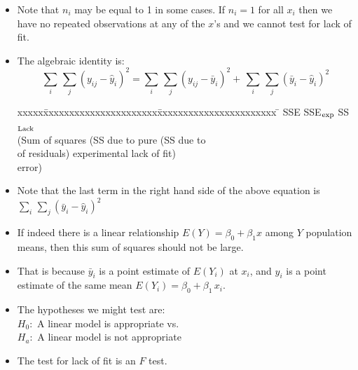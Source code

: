 \documentclass[xcolor=dvipsnames,12pt]{beamer}
\begin{document}
\begin{frame}
\begin{itemize}
\item Note that $n_i$ may be equal to 1 in some cases.  If $n_i=1$ for all $x_i$  then we have no
repeated observations at any of the  $x$'s and we cannot test for lack of
fit. \\[.1in]
\item The algebraic identity is:
$$
  \sum_i\,\sum_j (y_{ij} - \hat{y}_i)^2 =
  \sum_i\,\sum_j (y_{ij} - \bar{y}_i)^2 +\,
  \sum_i\,\sum_j (\bar{y}_i - \hat{y}_i)^2
$$
\begin{small}
\begin{tabbing}
xxxxx\=xxxxxxxxxxxxxxxxxxxxxx\= xxxxxxxxxxxxxxxxxxxxxxx \= \kill
\>SSE                 \> SSE$_{\rm{exp}}$  \> SS$_{\rm{Lack}}$ \\
\>(Sum of squares     \> (SS due to pure   \> (SS due to\\
\>of residuals)       \> experimental      \> lack of fit)\\
\>                      \> error)
\end{tabbing}
\end{small}
\end{itemize}
\end{frame}


\begin{frame}
\begin{itemize}
\item Note that the last term in the right hand side of the above equation is $  \sum_i\,\sum_j (\bar{y}_i - \hat{y}_i)^2$\\[.1in]
\item If indeed there is a linear relationship $E(Y) = \beta_0 + \beta_1x$
among $Y$ population means, then this sum of squares should not be
large.\\[.1in]
\item That is because $\bar{y}_i$ is a point estimate of $E(Y_i)$ at $x_i$,
and $\hat{y}_i$ is a point estimate of the same mean $E(Y_i) =
\beta_0 + \beta_1\,x_i$.\\[.1in]
\item The hypotheses we might test are:\\[.2in]
\hspace*{1in} $H_0:$ A linear model is appropriate vs.\\[.1in]
\hspace*{1in} $H_a:$ A linear model is not appropriate\\[.1in] 
\item The test for lack of fit is an $F$ test. 
\end{itemize}
\end{frame}
\end{document}
